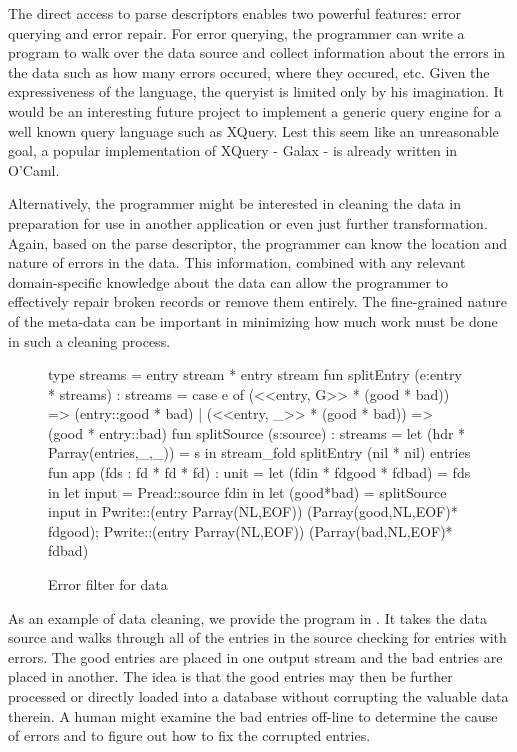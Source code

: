 \documentclass{entcs}
\begin{document}
The direct access to parse descriptors enables two powerful features:
error querying and error repair. For error querying, the programmer
can write a program to walk over the data source and collect
information about the errors in the data such as how many errors
occured, where they occured, etc. Given the expressiveness of the
language, the queryist is limited only by his imagination. It would be
an interesting future project to implement a generic query engine for
a well known query language such as XQuery. Lest this seem like an
unreasonable goal, a popular implementation of XQuery - Galax - is
already written in O'Caml.

Alternatively, the programmer might be interested in cleaning the data
in preparation for use in another application or even just further
transformation. Again, based on the parse descriptor, the programmer
can know the location and nature of errors in the data. This
information, combined with any relevant domain-specific knowledge
about the data can allow the programmer to effectively repair broken
records or remove them entirely. The fine-grained nature of the
meta-data can be important in minimizing how much work must be done in
such a cleaning process.

\begin{figure}
\begin{code}
type streams = entry stream * entry stream
\mbox{}
fun splitEntry (e:entry * streams) : streams =
  case e of
    (<<entry, G>> * (good * bad)) => (entry::good * bad)
  | (<<entry, _>> * (good * bad)) => (good * entry::bad)
\mbox{}    
fun splitSource (s:source) : streams =
    let (hdr * Parray(entries,_,_)) = s in 
    stream\_fold splitEntry (nil * nil) entries
\mbox{}
fun app (fds : fd * fd * fd) : unit =  
  let (fdin * fdgood * fdbad) = fds            in
  let input               = Pread::source fdin in
  let (good*bad)          = splitSource input  in
  Pwrite::(entry Parray(NL,EOF)) (Parray(good,NL,EOF)* fdgood);
  Pwrite::(entry Parray(NL,EOF)) (Parray(bad,NL,EOF)* fdbad)
\end{code}
\caption{Error filter for \dibbler{} data}
\label{fig:ex-data-clean}
\end{figure}

As an example of data cleaning, we provide the program in
. It takes the \dibbler{} data source and
walks through all of the entries in the source checking for entries
with errors.  The good entries are placed in one output stream and the
bad entries are placed in another.  The idea is that the good entries
may then be further processed or directly loaded into a database
without corrupting the valuable data therein.  A human might examine
the bad entries off-line to determine the cause of errors and to
figure out how to fix the corrupted entries.
\end{document}
